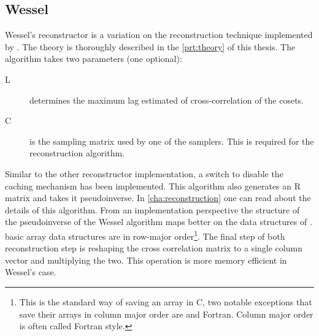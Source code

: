 \documentclass[a4paper, openany, oneside]{memoir}
\begin{document}
\subsection{Wessel}
\label{sub:wessel}
Wessel's reconstructor is a variation on the reconstruction technique implemented by . The theory is thoroughly described in the \cref{prt:theory} of this thesis. The algorithm takes two parameters (one optional):
\begin{description}
    \item[L] determines the maximum lag estimated of cross-correlation of the cosets.
    \item[C] is the sampling matrix used by one of the samplers. This is required for the reconstruction algorithm.
\end{description}
Similar to the other reconstructor implementation, a switch to disable the caching mechanism has been implemented. This algorithm also generates an R matrix and takes it pseudoinverse. In \cref{cha:reconstruction} one can read about the details of this algorithm. From an implementation perspective the structure of the pseudoinverse of the Wessel algorithm maps better on the data structures of .  basic array data structures are in row-major order\footnote{This is the standard way of saving an array in C, two notable exceptions that save their arrays in column major order are \matlab{} and Fortran. Column major order is often called Fortran style.}. The final step of both reconstruction step is reshaping the cross correlation matrix to a single column vector and multiplying the two. This operation is more memory efficient in Wessel's case.

\end{document}

